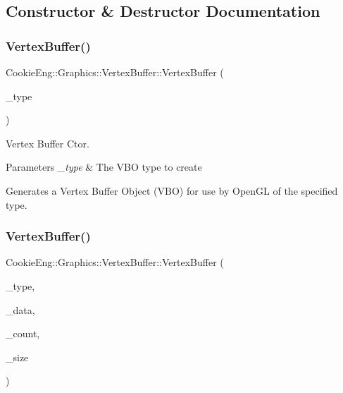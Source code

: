 \subsection{Constructor \& Destructor Documentation}
\mbox{\label{class_cookie_eng_1_1_graphics_1_1_vertex_buffer_ac877c409fdb8a09947bb13664b78a335}} 
\subsubsection{\texorpdfstring{Vertex\+Buffer()}{VertexBuffer()}\hspace{0.1cm}{\footnotesize\ttfamily [1/2]}}
{\footnotesize\ttfamily Cookie\+Eng\+::\+Graphics\+::\+Vertex\+Buffer\+::\+Vertex\+Buffer (\begin{DoxyParamCaption}\item[{const Vertex\+Buffer\+Type}]{\+\_\+type }\end{DoxyParamCaption})}



Vertex Buffer Ctor. 


\begin{DoxyParams}{Parameters}
{\em \+\_\+type} & The V\+BO type to create\\
\hline
\end{DoxyParams}
Generates a Vertex Buffer Object (V\+BO) for use by Open\+GL of the specified type. \mbox{\label{class_cookie_eng_1_1_graphics_1_1_vertex_buffer_af4ceb32a35ff5747f2f80c8cec1e7800}} 
\subsubsection{\texorpdfstring{Vertex\+Buffer()}{VertexBuffer()}\hspace{0.1cm}{\footnotesize\ttfamily [2/2]}}
{\footnotesize\ttfamily Cookie\+Eng\+::\+Graphics\+::\+Vertex\+Buffer\+::\+Vertex\+Buffer (\begin{DoxyParamCaption}\item[{const Vertex\+Buffer\+Type}]{\+\_\+type,  }\item[{const void $\ast$}]{\+\_\+data,  }\item[{G\+Luint}]{\+\_\+count,  }\item[{G\+Luint}]{\+\_\+size }\end{DoxyParamCaption})}



